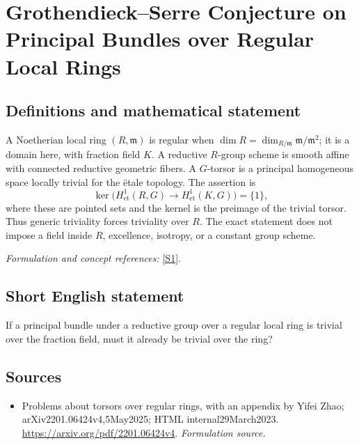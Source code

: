 \documentclass[11pt]{article}
\begin{document}
\section*{\texorpdfstring{Grothendieck–Serre Conjecture on Principal Bundles over Regular Local Rings}{Grothendieck–Serre Conjecture on Principal Bundles over Regular Local Rings}}\label{192}
\subsection{Definitions and mathematical statement}
A Noetherian local ring $(R,\mathfrak m)$ is regular when
$\dim R=\dim_{R/\mathfrak m}\mathfrak m/\mathfrak m^2$; it is a domain here, with fraction field $K$. A reductive $R$-group scheme is smooth affine with connected reductive geometric fibers. A $G$-torsor is a principal homogeneous space locally trivial for the \"etale topology. The assertion is
\[
 \ker\bigl(H^1_{\mathrm{et}}(R,G)\to H^1_{\mathrm{et}}(K,G)\bigr)=\{1\},
\]
where these are pointed sets and the kernel is the preimage of the trivial torsor. Thus generic triviality forces triviality over $R$. The exact statement does not impose a field inside $R$, excellence, isotropy, or a constant group scheme.
\par\smallskip\textit{Formulation and concept references:} \href{https://arxiv.org/pdf/2201.06424v4}{[S1]}.

\subsection{Short English statement}
If a principal bundle under a reductive group over a regular local ring is trivial over the fraction field, must it already be trivial over the ring?
\subsection{Sources}
\begin{itemize}
\item[S1]Problems about torsors over regular rings, with an appendix by Yifei Zhao; arXiv2201.06424v4,5May2025; HTML internal29March2023.
\url{https://arxiv.org/pdf/2201.06424v4}.
\textit{Formulation source.}
\end{itemize}
\end{document}
